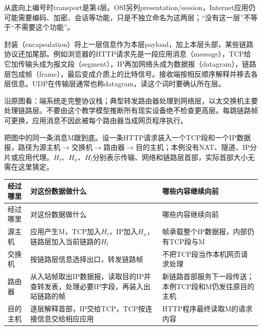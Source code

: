 从底向上编号时transport是第4层。OSI另列presentation/session，Internet应用仍可能需要编码、加密、会话等功能，只是不独立命名为这两层；“没有这一层”不等于“不需要这个功能”。


封装（encapsulation）将上一层信息作为本层payload，加上本层头部，某些链路协议还加尾部。例如浏览器的HTTP请求先是一段应用消息（message），TCP给它加传输头成为报文段（segment），IP再加网络头成为数据报（datagram），链路层包成帧（frame），最后变成介质上的比特信号。接收端按相反顺序解释并移去各层信息。UDP在传输层通常也称datagram，读这个词时要确认所在层。




沿原图看：端系统走完整协议栈；典型转发路由器处理到网络层，以太交换机主要处理链路层。不要由这个教学模型推断所有现实设备绝不检查更高层。每跳链路帧可更换，应用消息不因此被每个路由器当成网页程序执行。


把图中的同一条消息M跟到底。设一条HTTP请求装入一个TCP段和一个IP数据报，路径为源主机\ensuremath{\to}交换机\ensuremath{\to}路由器\ensuremath{\to}目的主机；本例没有NAT、隧道、IP分片或应用代理。\(H_t\)、\(H_n\)、\(H_l\)分别表示传输、网络和链路层首部，实际首部大小无需在这里猜定。


\begingroup
\small\setlength{\tabcolsep}{3pt}
\renewcommand{\arraystretch}{1.22}
\begin{longtable}{@{}>{\raggedright\arraybackslash}p{}>{\raggedright\arraybackslash}p{}>{\raggedright\arraybackslash}p{}@{}}
\toprule
经过哪里 & 对这份数据做什么 & 哪些内容继续向前 \\
\midrule\endfirsthead
经过哪里 & 对这份数据做什么 & 哪些内容继续向前 \\
\midrule\endhead
\bottomrule\endfoot
源主机 & 应用产生M，TCP加入\(H_t\)，IP加入\(H_n\)，链路层加入当前链路的\(H_l\) & 帧承载整个IP数据报，内部仍有TCP段与M \\
交换机 & 按链路层信息选择出口，转发链路帧 & 不把TCP段当作本机网页请求处理 \\
路由器 & 从入站帧取出IP数据报，读取目的IP并查转发表，处理必要IP字段，再装入出站链路的帧 & 新链路首部服务下一段传送；本例TCP段和M仍发往原目的主机 \\
目的主机 & 逐层解释首部，IP交给TCP，TCP按连接信息交给相应应用 & HTTP程序最终读取M的请求内容 \\
\end{longtable}
\endgroup


